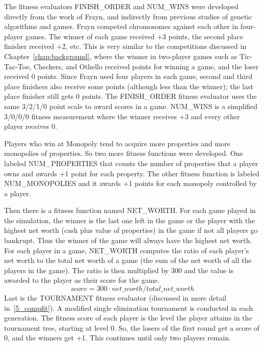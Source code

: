 The fitness evaluators FINISH\_ORDER and NUM\_WINS were developed directly from
the work of Frayn, and indirectly from previous studies of genetic algorithms
and games. Frayn competed chromosomes against each other in four-player games.
The winner of each game received +3 points, the second place finisher received
+2, etc. This is very similar to the competitions discussed in
Chapter~\ref{chap:background}, where the winner in two-player games such as
Tic-Tac-Toe, Checkers, and Othello received points for winning a game, and the
loser received 0 points. Since Frayn used four players in each game, second and
third place finishers also receive some points (although less than the winner);
the last place finisher still gets 0 points. The FINISH\_ORDER fitness evaluator
uses the same 3/2/1/0 point scale to award scores in a game. NUM\_WINS  is a
simplified 3/0/0/0 fitness measurement where the winner receives +3 and every 
other player receives 0.

Players who win at Monopoly tend to acquire more
properties and more monopolies of properties. So two more fitness functions were
developed. One labeled NUM\_PROPERTIES that counts the number of properties that
a player owns and awards +1 point for each property. The other fitness function
is labeled NUM\_MONOPOLIES and it awards +1 points for each monopoly controlled
by a player.

Then there is a fitness function named NET\_WORTH. For each game played in the
simulation, the winner is the last one left in the game or the player with the
highest net worth (cash plus value of properties) in the game if not all players
go bankrupt. Thus the winner of the game will always have the highest net worth.
For each player in a game, NET\_WORTH computes the ratio of each player's net
worth to the total net worth of a game (the sum of the net worth of all the
players in the game). The ratio is then multiplied by 300 and the value is
awarded to the player as their score for the game.
\begin{equation*}
score = 300 \cdot net\_worth / total\_net\_worth
\end{equation*}
Last is the TOURNAMENT fitness evaluator (discussed in more detail
in~\ref{5_compfit}). A modified single elimination tournament is conducted in
each generation. The fitness score of each player is the level the player
attains in the tournament tree, starting at level 0. So, the losers of the first
round get a score of 0, and the winners get +1. This continues until only two
players remain.


